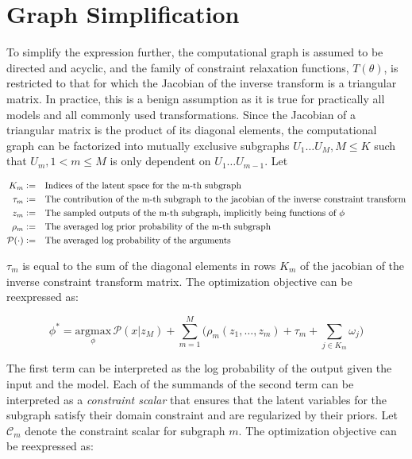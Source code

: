 \documentclass[10pt]{article}
\newcommand{\defeq}{\vcentcolon=}
\begin{document}
\section*{Graph Simplification}

To simplify the expression further, the computational graph is assumed to be directed and acyclic, and the family of 
constraint relaxation functions, $T(\theta)$, is restricted to that for which the Jacobian of the inverse transform is 
a triangular matrix. In practice, this is a benign assumption as it is true for practically all models and all commonly used 
transformations. Since the Jacobian of a triangular matrix is the product of its diagonal elements, 
the computational graph can be factorized into mutually exclusive subgraphs $U_1 \ldots U_M, M \leq K$ such that 
$U_m, 1 < m \leq M$ is only dependent on $U_1 \ldots U_{m - 1}$. Let

\begin{align*}
  K_m \defeq&\quad \text{Indices of the latent space for the m-th subgraph} \\
  \tau_m \defeq&\quad \text{The contribution of the m-th subgraph to the jacobian of the inverse constraint transform} \\
  z_m \defeq&\quad \text{The sampled outputs of the m-th subgraph, implicitly being functions of $\phi$} \\
  \rho_m \defeq&\quad \text{The averaged log prior probability of the m-th subgraph} \\
  \mathcal{P}(\cdot) \defeq&\quad \text{The averaged log probability of the arguments}
\end{align*}

$\tau_m$ is equal to the sum of the diagonal elements in rows $K_m$ of the jacobian of the inverse constraint transform matrix. The optimization 
objective can be reexpressed as:

\begin{equation*}
  \phi^* = \underset{\phi}{\text{argmax}} \, \mathcal{P}(x | z_M) + \sum_{m=1}^{M}\Big(\rho_m(z_1, \ldots, z_m ) + \tau_m + \sum_{j \in K_m}\omega_j \Big)
\end{equation*}

The first term can be interpreted as the log probability of the output given the input and the model. Each of the summands of the
second term can be interpreted as a \textit{constraint scalar} that ensures that the latent variables for the subgraph satisfy their 
domain constraint and are regularized by their priors. Let $\mathcal{C}_m$ denote the constraint scalar for subgraph $m$. The optimization
objective can be reexpressed as:
\end{document}

